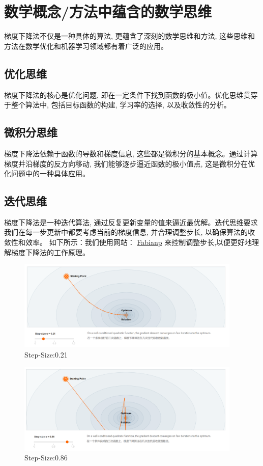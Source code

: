 \documentclass[printMode=true, declarePage=false]{ecnuthesis}
\begin{document}
    \section{数学概念/方法中蕴含的数学思维}
    梯度下降法不仅是一种具体的算法, 更蕴含了深刻的数学思维和方法, 这些思维和方法在数学优化和机器学习领域都有着广泛的应用。

    \subsection{优化思维}
    梯度下降法的核心是优化问题, 即在一定条件下找到函数的极小值。优化思维贯穿于整个算法中, 包括目标函数的构建, 学习率的选择, 以及收敛性的分析。

    \subsection{微积分思维}
    梯度下降法依赖于函数的导数和梯度信息, 这些都是微积分的基本概念。通过计算梯度并沿梯度的反方向移动, 我们能够逐步逼近函数的极小值点, 这是微积分在优化问题中的一种具体应用。

    \subsection{迭代思维}
    梯度下降法是一种迭代算法, 通过反复更新变量的值来逼近最优解。迭代思维要求我们在每一步更新中都要考虑当前的梯度信息, 并合理调整步长, 以确保算法的收敛性和效率。
    如下所示：我们使用网站：
    \href{https://fa.bianp.net/teaching/2018/COMP-652/gradient_descent.html}{Fabianp} 来控制调整步长,以便更好地理解梯度下降法的工作原理。
    \begin{figure} [H]
        \centering
        \includegraphics[width=0.95\textwidth]{Step021.png}
        \caption{Step-Size:0.21}
        \label{fig:gradient-descent}
    \end{figure}

    \begin{figure} [H]
        \centering
        \includegraphics[width=0.95\textwidth]{Step086.png}
        \caption{Step-Size:0.86}
        \label{fig:gradient-descent}
    \end{figure}
\end{document}
